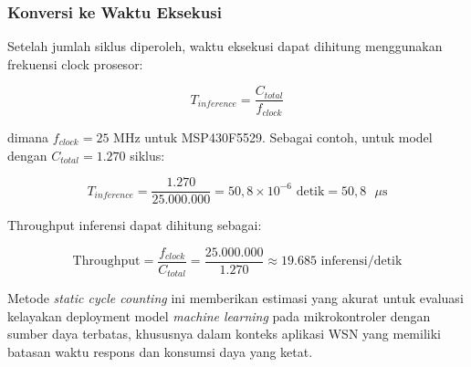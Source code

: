 \subsubsection{Konversi ke Waktu Eksekusi}

Setelah jumlah siklus diperoleh, waktu eksekusi dapat dihitung menggunakan frekuensi clock prosesor:

\begin{equation}
T_{inference} = \frac{C_{total}}{f_{clock}}
\label{eq:time-conversion}
\end{equation}

\noindent dimana $f_{clock} = 25$ MHz untuk MSP430F5529. Sebagai contoh, untuk model dengan $C_{total} = 1.270$ siklus:

\begin{equation}
T_{inference} = \frac{1.270}{25.000.000} = 50,8 \times 10^{-6} \text{ detik} = 50,8 \text{ }\mu\text{s}
\end{equation}

Throughput inferensi dapat dihitung sebagai:

\begin{equation}
\text{Throughput} = \frac{f_{clock}}{C_{total}} = \frac{25.000.000}{1.270} \approx 19.685 \text{ inferensi/detik}
\label{eq:throughput}
\end{equation}

Metode \textit{static cycle counting} ini memberikan estimasi yang akurat untuk evaluasi kelayakan deployment model \textit{machine learning} pada mikrokontroler dengan sumber daya terbatas, khususnya dalam konteks aplikasi WSN yang memiliki batasan waktu respons dan konsumsi daya yang ketat.
